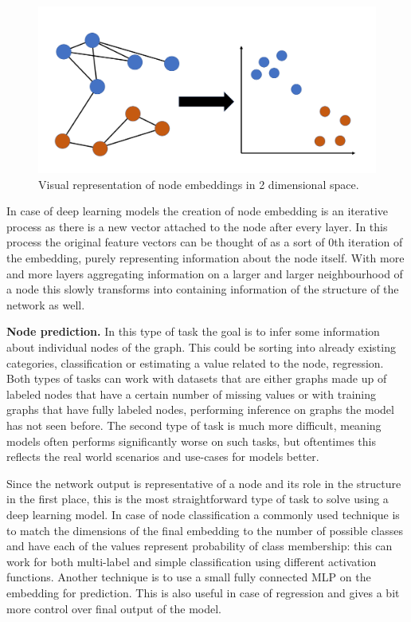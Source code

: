 	\begin{figure}[!h]
		\centering
		\includegraphics[width=\textwidth]{figures/embedding.png}
		\caption{Visual representation of node embeddings in 2 dimensional space.}
		\label{fig:embedding}
	\end{figure}
	
	In case of deep learning models the creation of node embedding is an iterative process as there is a new vector attached to the node after every layer. In this process the original feature vectors can be thought of as a sort of 0th iteration of the embedding, purely representing information about the node itself. With more and more layers aggregating information on a larger and larger neighbourhood of a node this slowly transforms into containing information of the structure of the network as well.
	
	\textbf{Node prediction.} In this type of task the goal is to infer some information about individual nodes of the graph. This could be sorting into already existing categories, classification or estimating a value related to the node, regression. Both types of tasks can work with datasets that are either graphs made up of labeled nodes that have a certain number of missing values or with training graphs that have fully labeled nodes, performing inference on graphs the model has not seen before. The second type of task is much more difficult, meaning models often performs significantly worse on such tasks, but oftentimes this reflects the real world scenarios and use-cases for models better.
	
	Since the network output is representative of a node and its role in the structure in the first place, this is the most straightforward type of task to solve using a deep learning model. In case of node classification a commonly used technique is to match the dimensions of the final embedding to the number of possible classes and have each of the values represent probability of class membership: this can work for both multi-label and simple classification using different activation functions. Another technique is to use a small fully connected MLP on the embedding for prediction. This is also useful in case of regression and gives a bit more control over final output of the model. 
	

